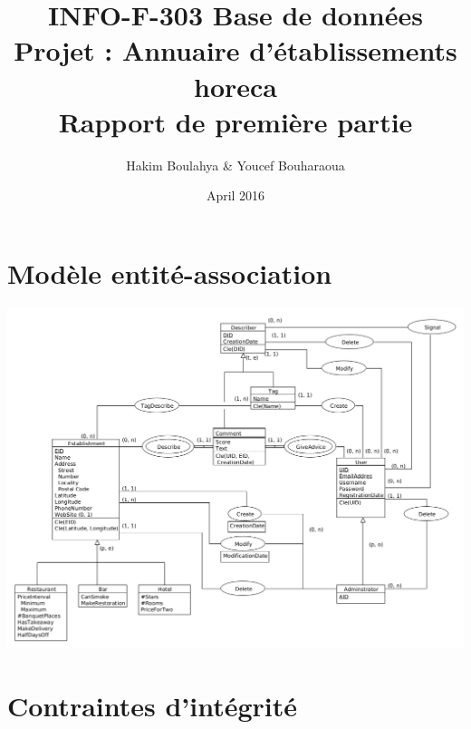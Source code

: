 \documentclass{article}
\title{INFO-F-303 Base de données\\ Projet : Annuaire d’établissements horeca \\ Rapport de première partie}
\author{Hakim Boulahya \& Youcef Bouharaoua}
\date{April 2016}
\begin{document}
\maketitle

\section*{Modèle entité-association}


\centerline{\includegraphics[scale=0.48]{model.png}}


\section*{Contraintes d'intégrité}
\end{document}
